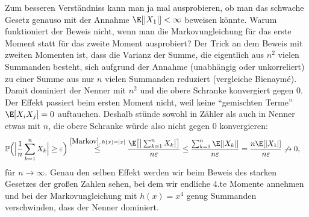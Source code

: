 	Zum besseren Verst\"andniss kann man ja mal ausprobieren, ob man das schwache Gesetz genauso mit der Annahme $\E[|X_1|]<\infty$ beweisen k\"onnte. Warum funktioniert der Beweis nicht, wenn man die Markovungleichung f\"ur das erste Moment statt f\"ur das zweite Moment ausprobiert? Der Trick an dem Beweis mit zweiten Momenten ist, dass die Varianz der Summe, die eigentlich aus $n^2$ vielen Summanden besteht, sich aufgrund der Annahme (unabh\"angig oder unkorreliert) zu einer Summe aus nur $n$ vielen Summanden reduziert (vergleiche Bienaym\'e). Damit dominiert der Nenner mit $n^2$ und die obere Schranke konvergiert gegen $0$. Der Effekt passiert beim ersten Moment nicht, weil keine \enquote{gemischten Terme} $\E[X_iX_j]=0$ auftauchen. Deshalb st\"unde sowohl in Z\"ahler als auch in Nenner etwas mit $n$, die obere Schranke w\"urde also nicht gegen $0$ konvergieren:
	\begin{align*}
		\mathbb{P}\Big(\Big|\frac{1}{n} \sum\limits_{k=1}^{n} X_k\Big| \geq \varepsilon\Big)
		&\overset{\ref{Markov},\, h(x)=|x|}{\leq} \frac{\E \big[\big|\sum_{k=1}^n X_k\big|\big] }{n\varepsilon}\leq \frac{\sum_{k=1}^n \E[|X_k|]}{n\varepsilon}= \frac{n\E[|X_1|]}{n\varepsilon} \not\to 0,
	\end{align*}
	f\"ur $n\to\infty$. Genau den selben Effekt werden wir beim Beweis des starken Gesetzes der gro\ss en Zahlen sehen, bei dem wir endliche 4.te Momente annehmen und bei der Markovungleichung mit $h(x)=x^4$ genug Summanden verschwinden, dass der Nenner dominiert.
	
	